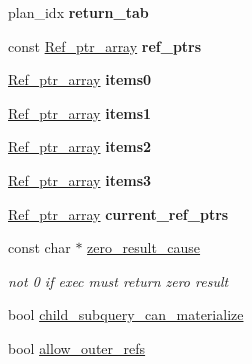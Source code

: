 \begin{DoxyCompactItemize}
\item 
\mbox{\label{classJOIN_a69414d2af96dd69713bbe5f1804f37e4}} 
plan\+\_\+idx {\bfseries return\+\_\+tab}
\item 
\mbox{\label{classJOIN_a8b69d65e635279e69f4ca23dd2035ed4}} 
const \mbox{\hyperlink{classBounds__checked__array}{Ref\+\_\+ptr\+\_\+array}} {\bfseries ref\+\_\+ptrs}
\item 
\mbox{\label{classJOIN_ac871e06ade890b1fe2376ad9cfdfdad4}} 
\mbox{\hyperlink{classBounds__checked__array}{Ref\+\_\+ptr\+\_\+array}} {\bfseries items0}
\item 
\mbox{\label{classJOIN_a3093588ea39a20b0ff794650c9accc90}} 
\mbox{\hyperlink{classBounds__checked__array}{Ref\+\_\+ptr\+\_\+array}} {\bfseries items1}
\item 
\mbox{\label{classJOIN_a9731ce345e9cea52cd47ed356f9f206b}} 
\mbox{\hyperlink{classBounds__checked__array}{Ref\+\_\+ptr\+\_\+array}} {\bfseries items2}
\item 
\mbox{\label{classJOIN_aaf2e265dfb134450bc8677082a155fdf}} 
\mbox{\hyperlink{classBounds__checked__array}{Ref\+\_\+ptr\+\_\+array}} {\bfseries items3}
\item 
\mbox{\label{classJOIN_ab35e0fcc4a92600b507b9ba539051d56}} 
\mbox{\hyperlink{classBounds__checked__array}{Ref\+\_\+ptr\+\_\+array}} {\bfseries current\+\_\+ref\+\_\+ptrs}
\item 
\mbox{\label{classJOIN_addac585920592d95d4976472a85f20fd}} 
const char $\ast$ \mbox{\hyperlink{classJOIN_addac585920592d95d4976472a85f20fd}{zero\+\_\+result\+\_\+cause}}
\begin{DoxyCompactList}\small\item\em not 0 if exec must return zero result \end{DoxyCompactList}\item 
bool \mbox{\hyperlink{classJOIN_a2a6bdffc54ec0343c81cf6c7e17e220a}{child\+\_\+subquery\+\_\+can\+\_\+materialize}}
\item 
bool \mbox{\hyperlink{classJOIN_a5de6e2e20ebbd43a75a32f6bf4cf07f7}{allow\+\_\+outer\+\_\+refs}}
\item 

\end{DoxyCompactItemize}
